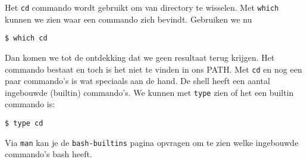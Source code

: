 Het \texttt{cd} commando wordt gebruikt om van directory te wisselen. Met \texttt{which} kunnen we zien waar een commando zich bevindt. Gebruiken we nu
\begin{lstlisting}
$ which cd
\end{lstlisting}
Dan komen we tot de ontdekking dat we geen resultaat terug krijgen. Het commando bestaat en toch is het niet te vinden in ons PATH. Met \texttt{cd} en nog een paar commando's is wat speciaals aan de hand. De shell heeft een aantal ingebouwde (builtin) commando's. We kunnen met \texttt{type} zien of het een builtin commando is:
\begin{lstlisting}
$ type cd
\end{lstlisting}
Via \texttt{man} kan je de \texttt{bash-builtins} pagina opvragen om te zien welke ingebouwde commando's bash heeft.

